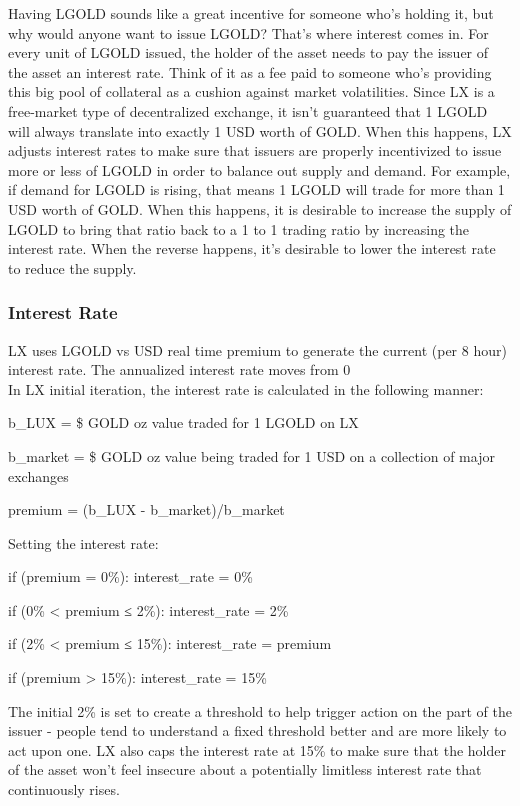 \documentclass[11pt]{article}
\begin{document}
Having LGOLD sounds like a great incentive for someone who's holding it, but why would anyone want to issue LGOLD? That's where interest comes in. For every unit of LGOLD issued, the holder of the asset needs to pay the issuer of the asset an interest rate. Think of it as a fee paid to someone who's providing this big pool of collateral as a cushion against market volatilities. Since LX is a free-market type of decentralized exchange, it isn't guaranteed that 1 LGOLD will always translate into exactly 1 USD worth of GOLD. When this happens, LX adjusts interest rates to make sure that issuers are properly incentivized to issue more or less of LGOLD in order to balance out supply and demand. For example, if demand for LGOLD is rising, that means 1 LGOLD will trade for more than 1 USD worth of GOLD. When this happens, it is desirable to increase the supply of LGOLD to bring that ratio back to a 1 to 1 trading ratio by increasing the interest rate. When the reverse happens, it's desirable to lower the interest rate to reduce the supply.


\subsubsection{Interest Rate}

LX uses LGOLD vs USD real time premium to generate the current (per 8 hour) interest rate. The annualized interest rate moves from 0\\%


In LX initial iteration, the interest rate is calculated in the following manner:


b\_LUX = \$ GOLD oz value traded for 1 LGOLD on LX


b\_market = \$ GOLD oz value being traded for 1 USD on a collection of major exchanges


premium = (b\_LUX - b\_market)/b\_market


Setting the interest rate:


if (premium = 0\%): interest\_rate = 0\%


if (0\% < premium ≤ 2\%): interest\_rate = 2\%


if (2\% < premium ≤ 15\%): interest\_rate = premium


if (premium > 15\%): interest\_rate = 15\%


The initial 2\% is set to create a threshold to help trigger action on the part of the issuer - people tend to understand a fixed threshold better and are more likely to act upon one. LX also caps the interest rate at 15\% to make sure that the holder of the asset won't feel insecure about a potentially limitless interest rate that continuously rises.
\end{document}
